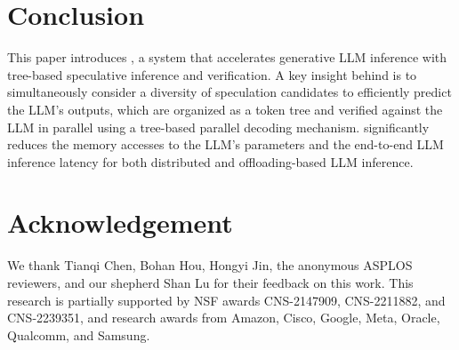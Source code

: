 \section{Conclusion}
This paper introduces \Sys, a system that accelerates generative LLM inference with tree-based speculative inference and verification.
A key insight behind \Sys is to simultaneously consider a diversity of speculation candidates to efficiently predict the LLM’s outputs, which are organized as a token tree and verified against the LLM in parallel using a tree-based parallel decoding mechanism.
\Sys significantly reduces the memory accesses to the LLM's parameters and the end-to-end LLM inference latency for both distributed and offloading-based LLM inference.

\iffinal
\section*{Acknowledgement}
We thank Tianqi Chen, Bohan Hou, Hongyi Jin, the anonymous ASPLOS reviewers, and our shepherd Shan Lu for their feedback on this work. This research is partially supported by NSF awards CNS-2147909, CNS-2211882, and CNS-2239351, and research awards from Amazon, Cisco, Google, Meta, Oracle, Qualcomm, and Samsung. 
\fi 
